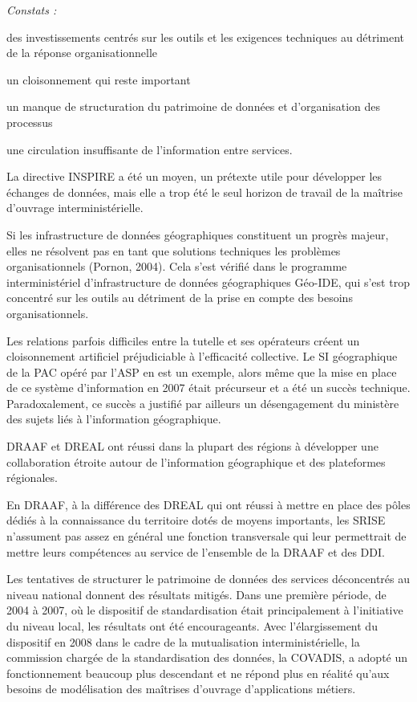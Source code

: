 {\it Constats :

\startitemize[a,packed]

\item des investissements centrés sur les outils et les exigences techniques au
détriment de la réponse organisationnelle

\item un cloisonnement qui reste important

\item un manque de structuration du patrimoine de données et d'organisation des
processus

\item une circulation insuffisante de l'information entre services.

\stopitemize}

La directive INSPIRE a été un moyen, un prétexte utile pour développer les
échanges de données, mais elle a trop été le seul horizon de travail de la
maîtrise d'ouvrage interministérielle.

Si les infrastructure de données géographiques constituent un progrès majeur,
elles ne résolvent pas en tant que solutions techniques les problèmes
organisationnels (Pornon, 2004). Cela s'est vérifié dans le programme
interministériel d'infrastructure de données géographiques Géo-IDE, qui s'est
trop concentré sur les outils au détriment de la prise en compte des besoins
organisationnels.

Les relations parfois difficiles entre la tutelle et ses opérateurs créent un
cloisonnement artificiel préjudiciable à l'efficacité collective. Le SI
géographique de la PAC opéré par l'ASP en est un exemple, alors même que la
mise en place de ce système d'information en 2007 était précurseur et a été un
succès technique. Paradoxalement, ce succès a justifié par ailleurs un
désengagement du ministère des sujets liés à l'information géographique.

DRAAF et DREAL ont réussi dans la plupart des régions à
développer une collaboration étroite autour de l'information géographique et
des plateformes régionales.

En DRAAF, à la différence des DREAL qui ont réussi à mettre en place des pôles
dédiés à la connaissance du territoire dotés de moyens importants, les SRISE
n'assument pas assez en général une fonction transversale qui leur permettrait
de mettre leurs compétences au service de l'ensemble de la DRAAF et des DDI.

Les tentatives de structurer le patrimoine de données des services
déconcentrés au niveau national donnent des résultats mitigés. Dans une
première période, de 2004 à 2007, où le dispositif de standardisation était
principalement à l'initiative du niveau local, les résultats ont été
encourageants. Avec l'élargissement du dispositif en 2008 dans le cadre de la
mutualisation interministérielle, la commission chargée de la standardisation
des données, la COVADIS, a adopté un fonctionnement beaucoup plus descendant
et ne répond plus en réalité qu'aux besoins de modélisation des maîtrises
d'ouvrage d'applications métiers.

